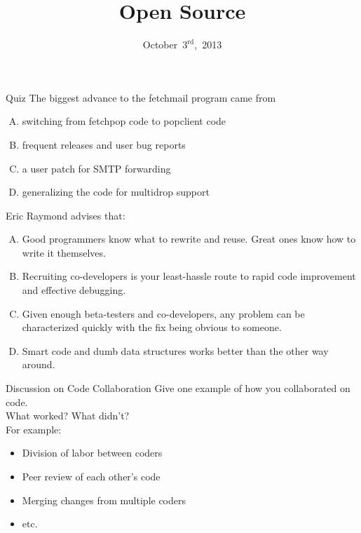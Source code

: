 \documentclass{beamer}
\title{Open Source}
\date{October~$3^{\text{rd}}$,~2013}
\begin{document}
\begin{frame}
\titlepage
\end{frame}

\begin{frame}{Quiz}
The biggest advance to the fetchmail program came from
\begin{enumerate}[(A)]
\item<1> switching from fetchpop code to popclient code
\item<1> frequent releases and user bug reports
\item<1-2> a user patch for SMTP forwarding
\item<1> generalizing the code for multidrop support
\end{enumerate}
\medskip
Eric Raymond advises that:
\begin{enumerate}[(A)]
\item<1> Good programmers know what to rewrite and reuse. Great ones know how to write it themselves.
\item<1> Recruiting co-developers is your least-hassle route to rapid code improvement and effective debugging.
\item<1-2> Given enough beta-testers and co-developers, any problem can be characterized quickly with the fix being obvious to someone.
\item<1>  Smart code and dumb data structures works better than the other way around.
\end{enumerate}
\end{frame}

\begin{frame}{Discussion on Code Collaboration}
Give one example of how you collaborated on code.\\
\bigskip
\bigskip
What worked? What didn't?\\
\bigskip
\bigskip
\pause
For example:
\begin{itemize}
\item Division of labor between coders
\item Peer review of each other's code
\item Merging changes from multiple coders
\item etc.
\end{itemize}
\end{frame}
\end{document}
